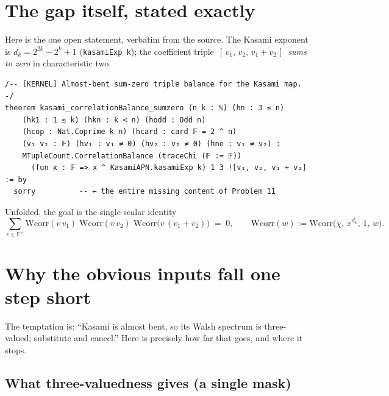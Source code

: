 \documentclass[11pt]{article}
\begin{document}
\bigskip

\section{The gap itself, stated exactly}

\noindent
Here is the one open statement, verbatim from the source.  The Kasami exponent
is $d_k = 2^{2k}-2^k+1$ (\texttt{kasamiExp k}); the coefficient triple
$\,[\,v_1,\,v_2,\,v_1{+}v_2\,]\,$ \emph{sums to zero} in characteristic two.

\begin{lstlisting}
/-- [KERNEL] Almost-bent sum-zero triple balance for the Kasami map. -/
theorem kasami_correlationBalance_sumzero (n k : ℕ) (hn : 3 ≤ n)
    (hk1 : 1 ≤ k) (hkn : k < n) (hodd : Odd n)
    (hcop : Nat.Coprime k n) (hcard : card 𝔽 = 2 ^ n)
    (v₁ v₂ : 𝔽) (hv₁ : v₁ ≠ 0) (hv₂ : v₂ ≠ 0) (hne : v₁ ≠ v₂) :
    MTupleCount.CorrelationBalance (traceChi (𝔽 := 𝔽))
      (fun x : 𝔽 => x ^ KasamiAPN.kasamiExp k) 1 3 ![v₁, v₂, v₁ + v₂] := by
  sorry          -- ← the entire missing content of Problem 11
\end{lstlisting}

\medskip

\noindent
Unfolded, the goal is the single scalar identity
\[
  \sum_{v\in\mathbb{F}^{\times}}
    \mathrm{Wcorr}(v\,v_1)\;
    \mathrm{Wcorr}(v\,v_2)\;
    \mathrm{Wcorr}\bigl(v\,(v_1{+}v_2)\bigr)
  \;=\;0,
  \qquad
  \mathrm{Wcorr}(w):=\mathrm{Wcorr}\bigl(\chi,\,x^{d_k},\,1,\,w\bigr).
\]


\bigskip

\section{Why the obvious inputs fall one step short}

\noindent
The temptation is: ``Kasami is almost bent, so its Walsh spectrum is
three-valued; substitute and cancel.''  Here is precisely how far that goes,
and where it stops.

\subsection*{What three-valuedness gives (a single mask)}
\end{document}

